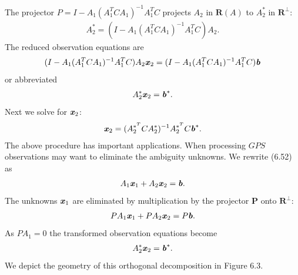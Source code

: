 The projector $P = I -A_{1}(A^{T}_{1}CA_{1})^{-1}A^{T}_{1}C $ projects $A_{2}$ in $\textbf{R}(A)$ to $ A^{*}_{2}$ in $\textbf{R}^{\bot} $:
\begin{align*}
A^{*}_{2} = (I -A_{1}(A^{T}_{1}CA_{1})^{-1}A^{T}_{1}C)A_{2}.
\end{align*}
The reduced observation equations are
\begin{align*}
(I -A_{1}(A^{T}_{1}CA_{1})^{-1}A^{T}_{1}C)A_{2}\textbf{\textit{x}}_{2} =
(I -A_{1}(A^{T}_{1}CA_{1})^{-1}A^{T}_{1}C)\textbf{\textit{b}}
\end{align*}
or abbreviated
\begin{align*}
A^{*}_{2}\textbf{\textit{x}}_{2} = \textbf{\textit{b}}^{*}.
\end{align*}
Next we solve for $ \textbf{\textit{x}}_{2}$:
\begin{align}
\textbf{\textit{x}}_{2} = ( A^{*^T}_{2}CA^{*}_{2} )^{-1}A^{*^T}_{2}C \textbf{\textit{b}}^{*}.
\end{align}
The above procedure has important applications. When processing $GPS$ observations may want to eliminate the ambiguity unknowns. We rewrite (6.52) as
\begin{align*}
A_{1}\textbf{\textit{x}}_{1} + A_{2}\textbf{\textit{x}}_{2} = \textbf{\textit{b}}.
\end{align*}
The unknowns $ \textbf{\textit{x}}_{1}$ are eliminated by multiplication by the projector $\textbf{P}$ onto $ \textbf{R}^{\bot}$:
\begin{align*}
PA_{1}\textbf{\textit{x}}_{1} + PA_{2}\textbf{\textit{x}}_{2} = P\textbf{\textit{b}}.
\end{align*}
As $PA_{1}=0$ the transformed observation equations become
\begin{align*}
A^{*}_{2}\textbf{\textit{x}}_{2}= \textbf{\textit{b}}^{*}.
\end{align*}
We depict the geometry of this orthogonal decomposition in Figure 6.3.

